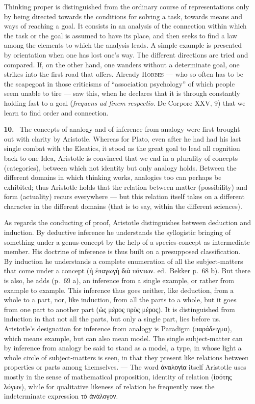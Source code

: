 \documentclass[12pt]{book}
\newcommand{\hnum}[1]{\noindent\textbf{#1.}~}
\newcommand{\opage}[1]{\marginnote{\footnotesize\textit{[#1]}}}
\begin{document}
\opage{52}Thinking proper is distinguished from the ordinary course of representations
only by being directed towards the conditions for solving a task, towards means
and ways of reaching a goal. It consists in an analysis of the connection within
which the task or the goal is assumed to have its place, and then seeks to find
a law among the elements to which the analysis leads. A simple example is
presented by orientation when one has lost one's way. The different directions
are tried and compared. If, on the other hand, one wanders without a determinate
goal, one strikes into the first road that offers. Already \textsc{Hobbes} ---
who so often has to be the scapegoat in those criticisms of ``association
psychology'' of which people seem unable to tire --- saw this, when he declares
that it is through constantly holding fast to a goal (\textit{frequens ad finem
respectio}. De Corpore XXV, 9) that we learn to find order and connection.

\hnum{10} The concepts of analogy and of inference from analogy were first
brought out with clarity by Aristotle. Whereas for Plato, even after he had had
his last single combat with the Eleatics, it stood as the great goal to lead all
cognition back to one Idea, Aristotle is convinced that we end in a plurality of
concepts (categories), between which not identity but only analogy holds.
Between the different domains in which thinking works, analogies too can perhaps
be exhibited; thus Aristotle holds that the relation between matter
(possibility) and form (actuality) recurs everywhere --- but this relation
itself takes on a different character in the different domains (that is to say,
within the different sciences).

As regards the conducting of proof, Aristotle distinguishes between deduction
and induction. By deductive inference he understands the syllogistic bringing of
something under a genus-concept by the help \opage{53}of a species-concept as intermediate
member. His doctrine of inference is thus built on a presupposed classification.
By induction he understands a complete enumeration of all the subject-matters
that come under a concept (ἡ ἐπαγωγὴ διὰ πάντων. ed.\ Bekker p.\ 68 b). But
there is also, he adds (p.\ 69 a), an inference from a single example, or rather
from example to example. This inference thus goes neither, like deduction, from
a whole to a part, nor, like induction, from all the parts to a whole, but it
goes from one part to another part (ὡς μέρος πρὸς μέρος). It is distinguished
from induction in that not all the parts, but only a single part, lies before
us. Aristotle's designation for inference from analogy is Paradigm
(παράδειγμα), which means example, but can also mean model. The single
subject-matter can by inference from analogy be said to stand as a model, a
type, in whose light a whole circle of subject-matters is seen, in that they
present like relations between properties or parts among themselves. --- The
word ἀναλογία itself Aristotle uses mostly in the sense of mathematical
proposition, identity of relation (ἰσότης λόγων), while for qualitative likeness
of relation he frequently uses the indeterminate expression τὸ ἀνάλογον.
\end{document}
